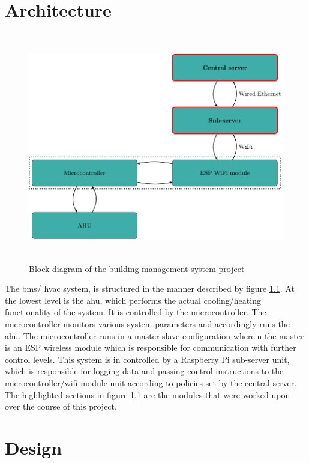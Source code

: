 \documentclass[letterpaper,11pt]{report}
\begin{document}
\chapter{Architecture}\label{chapter:architecture}
\onehalfspacing
\begin{figure}[h]
\includegraphics[width=14cm, height=10cm]{arch}
\centering
\captionsetup{justification=centering}
\caption{Block diagram of the building management system project}
\label{fig:arch}
\end{figure}
The \ac{bms}/ \ac{hvac} system, is structured in the manner described by figure \ref{fig:arch}. At the lowest level is the \ac{ahu}, which performs the actual cooling/heating functionality of the system. It is controlled by the microcontroller. The microcontroller monitors various system parameters and accordingly runs the \ac{ahu}. The microcontroller runs in a master-slave configuration wherein the master is an ESP wireless module which is responsible for communication with further control levels. This system is in controlled by a Raspberry Pi sub-server unit, which is responsible for logging data and passing control instructions to the microcontroller/wifi module unit according to policies set by the central server. The highlighted sections in figure \ref{fig:arch} are the modules that were worked upon over the course of this project.

\newpage
\chapter{Design}\label{chapter:Design}
\onehalfspacing
\end{document}
